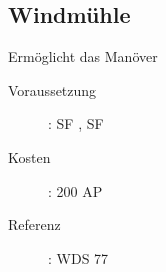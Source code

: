 \subsection{Windmühle}
\label{sf.windmuehle}
Ermöglicht das Manöver 
\begin{description}
    \item[Voraussetzung]:
        SF , SF 
    \item [Kosten]:
        200 AP
    \item [Referenz]:
        WDS 77
\end{description}
